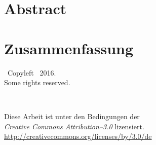 \newpage

\thispagestyle{empty}
\vspace{4cm}
\section*{Abstract}
\ThesisAbstractEnglish

\vspace{3cm}
\section*{Zusammenfassung}
\ThesisAbstractDeutsch

\newpage

\thispagestyle{empty}
\vspace*{0in}
\begin{center}
	{\Large{}}\ Copyleft \ThesisAuthor~2016. \\
  Some rights reserved. \\
  \vspace{1in}
  \begin{minipage}[c]{0.2\linewidth}
    \hfill {\Huge \ccLogo~\ccAttribution}
  \end{minipage}
  \hspace{0.1cm}
  \begin{minipage}[c]{0.7\linewidth}
    Diese Arbeit ist unter den Bedingungen der \\
    \textit{Creative Commons Attribution--3.0} lizensiert. \\
    \url{http://creativecommons.org/licenses/by/3.0/de}
  \end{minipage}
\end{center}
\vspace{6cm}
\ThesisThanks
\clearpage
